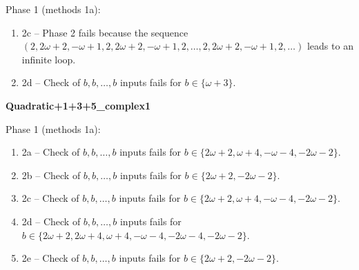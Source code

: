 \begin{exmp}
Phase 1 (methods 1a):
\begin{enumerate}[ ]
\item  2c -- Phase 2   fails because  the sequence $(2,\allowbreak  2\omega + 2,\allowbreak  -\omega + 1,\allowbreak  2,\allowbreak  2\omega + 2,\allowbreak  -\omega + 1,\allowbreak  2,\allowbreak  \dots ,\allowbreak 2,\allowbreak  2\omega + 2,\allowbreak  -\omega + 1,\allowbreak  2,\allowbreak  \dots)$ leads to an infinite loop.
\item  2d -- Check of $b,\allowbreak b,\allowbreak \dots,\allowbreak b$ inputs fails for $b\in \{\omega + 3\}$.
\end{enumerate}


\end{exmp}




\begin{exmp}
\label{ex:compareAN}

\textbf{Quadratic+1+3+5\_complex1}

Phase 1 (methods 1a):
\begin{enumerate}[ ]
\item  2a -- Check of $b,\allowbreak b,\allowbreak \dots,\allowbreak b$ inputs fails for $b\in \{2\omega + 2,\allowbreak  \omega + 4,\allowbreak  -\omega - 4,\allowbreak  -2\omega - 2\}$.
\item  2b -- Check of $b,\allowbreak b,\allowbreak \dots,\allowbreak b$ inputs fails for $b\in \{2\omega + 2,\allowbreak  -2\omega - 2\}$.
\item  2c -- Check of $b,\allowbreak b,\allowbreak \dots,\allowbreak b$ inputs fails for $b\in \{2\omega + 2,\allowbreak  \omega + 4,\allowbreak  -\omega - 4,\allowbreak  -2\omega - 2\}$.
\item  2d -- Check of $b,\allowbreak b,\allowbreak \dots,\allowbreak b$ inputs fails for $b\in \{2\omega + 2,\allowbreak  2\omega + 4,\allowbreak  \omega + 4,\allowbreak  -\omega - 4,\allowbreak  -2\omega - 4,\allowbreak  -2\omega - 2\}$.
\item  2e -- Check of $b,\allowbreak b,\allowbreak \dots,\allowbreak b$ inputs fails for $b\in \{2\omega + 2,\allowbreak  -2\omega - 2\}$.
\end{enumerate}



\end{exmp}
